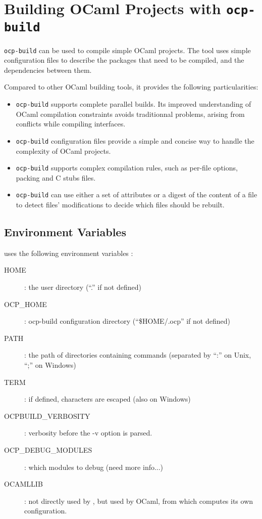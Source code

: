\chapter{Building OCaml Projects with {\tt ocp-build}}

{\tt ocp-build} can be used to compile simple OCaml projects.
The tool uses simple configuration files to describe the
packages that need to be compiled, and the dependencies between
them.

Compared to other OCaml building tools, it provides the following
particularities:
\begin{itemize}
\item {\tt ocp-build} supports complete parallel builds. Its improved
  understanding of OCaml compilation constraints avoids traditionnal
  problems, arising from conflicts while compiling interfaces.
\item {\tt ocp-build} configuration files provide a simple and concise
  way to handle the complexity of OCaml projects.
\item {\tt ocp-build} supports complex compilation rules, such as
  per-file options, packing and C stubs files.
\item {\tt ocp-build} can use either a set of attributes or a digest
  of the content of a file to detect files' modifications to decide
  which files should be rebuilt.
\end{itemize}

\section{Environment Variables}

\ocpbuild{} uses the following environment variables :
\begin{description}
\item[HOME] : the user directory (``.'' if not defined)
\item[OCP\_HOME] : ocp-build configuration directory (``\$HOME/.ocp''
  if not defined)
\item[PATH] : the path of directories containing commands (separated
  by ``:'' on Unix, ``;'' on Windows)
\item[TERM] : if defined, characters are escaped (also on Windows)
\item[OCPBUILD\_VERBOSITY] : verbosity before the -v option is parsed.
\item[OCP\_DEBUG\_MODULES] : which modules to debug (need more info...)
\item[OCAMLLIB] : not directly used by \ocpbuild{}, but used by OCaml,
  from which \ocpbuild{} computes its own configuration.
\end{description}

